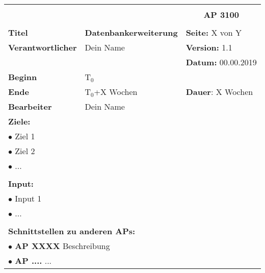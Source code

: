 \clearpage
\begin{table}[!h]
 \begin{center}
  \begin{tabular}{|p{35mm}||p{55mm}|p{50mm}||p{40mm}|}
   \hline
   \multicolumn{3}{|l||}{\textbf{}} & \multicolumn{1}{c|}{}\\
   \multicolumn{3}{|l||}{\textbf{}} & \multicolumn{1}{c|}{\textbf{AP 3100}}\\
   \multicolumn{3}{|l||}{\textbf{}} & \multicolumn{1}{c|}{}\\
   \hline\hline
   \textbf{Titel} & \multicolumn{2}{p{7cm}||}{\textbf{Datenbankerweiterung}} & \textbf{Seite:} X von Y\\
   \hline
   \textbf{Verantwortlicher} & \multicolumn{2}{l||}{Dein Name} & \textbf{Version:} 1.1\\
   \hline
   \multicolumn{3}{|l||}{} & \textbf{Datum:} 00.00.2019\\
   \hline\hline
   \textbf{Beginn} & \multicolumn{2}{l||}{T$_0$} & \\
   \hline
   \textbf{Ende} & \multicolumn{2}{l||}{T$_0$+X Wochen} & \textbf{Dauer}: X Wochen\\
   \hline\hline
   \textbf{Bearbeiter} & \multicolumn{3}{l|}{Dein Name}\\
   \hline\hline
   \multicolumn{4}{|p{150mm}|}{\textbf{Ziele:}}\\
   \multicolumn{4}{|p{150mm}|}{$\bullet$ Ziel 1}\\
   \multicolumn{4}{|p{150mm}|}{$\bullet$ Ziel 2}\\
   \multicolumn{4}{|p{150mm}|}{$\bullet$ ...}\\
   \multicolumn{4}{|p{150mm}|}{}\\
   \multicolumn{4}{|p{150mm}|}{\textbf{Input:}}\\
   \multicolumn{4}{|p{150mm}|}{$\bullet$ Input 1}\\
   \multicolumn{4}{|p{150mm}|}{$\bullet$ ...}\\
   \multicolumn{4}{|p{150mm}|}{}\\
   \multicolumn{4}{|p{150mm}|}{\textbf{Schnittstellen zu anderen APs:}}\\
   \multicolumn{4}{|p{150mm}|}{$\bullet$ \textbf{AP XXXX} Beschreibung}\\
   \multicolumn{4}{|p{150mm}|}{$\bullet$ \textbf{AP ....} ...}\\

\end{tabular}
\end{center}
\end{table}
